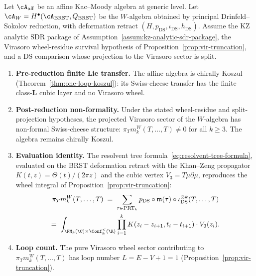 \begin{theorem}
\label{thm:tree-wheel-bridge}
Let\/ $\cA_{\mathrm{aff}}$ be an affine Kac--Moody algebra at
generic level. Let\/ $\cA_W = H^\bullet(
\cA_{\mathrm{BRST}}, Q_{\mathrm{BRST}})$ be the\/ $W$-algebra
obtained by principal Drinfeld--Sokolov reduction, with
deformation retract\/
$(H, p_{\mathrm{DS}}, \iota_{\mathrm{DS}}, h_{\mathrm{DS}})$.
Assume the KZ analytic SDR package
of Assumption~\ref{assum:kz-analytic-sdr-package}, the Virasoro
wheel-residue survival hypothesis of
Proposition~\ref{prop:vir-truncation}, and a DS comparison whose
projection to the Virasoro sector is split.
\begin{enumerate}[label=\textup{(\roman*)}]
\item \textbf{Pre-reduction finite Lie transfer.}
 The affine algebra is chirally Koszul
 \textup{(}Theorem~\textup{\ref{thm:one-loop-koszul}}\textup{)}:
 its Swiss-cheese transfer has the finite class-$\mathbf{L}$ cubic
 layer and no Virasoro wheel.

\item \textbf{Post-reduction non-formality.}
 Under the stated wheel-residue and split-projection hypotheses, the
 projected Virasoro sector of the\/ $W$-algebra has non-formal
 Swiss-cheese structure: $\pi_T m_k^W(T,\ldots,T)\neq0$ for all
 $k\geq3$. The algebra remains chirally Koszul.

\item \textbf{Evaluation identity.}
 The resolvent tree formula~\eqref{eq:resolvent-tree-formula},
 evaluated on the BRST deformation retract with the
 Khan--Zeng propagator
 $K(t,z) = \Theta(t)/(2\pi z)$ and the cubic vertex\/
 $V_3 = T\mu\partial\mu$, reproduces the wheel integral of
 Proposition~\textup{\ref{prop:vir-truncation}}:
 \begin{multline}
 \label{eq:tree-wheel-evaluation}
 \pi_T m_k^W(T, \ldots, T)
 \;=\;
 \sum_{\tau \in \mathrm{PRT}_k}
 p_{\mathrm{DS}} \circ \mathfrak{m}(\tau) \circ
 \iota_{\mathrm{DS}}^{\otimes k}(T, \ldots, T)\\
 =\;
 \int_{\FM_k(\C) \times \Conf_k^{<}(\R)}
 \prod_{i=1}^k K(z_i - z_{i+1}, t_i - t_{i+1})
 \cdot V_3(z_i).
 \end{multline}
\item \textbf{Loop count.}
 The pure Virasoro wheel sector contributing to
 $\pi_T m_k^W(T,\ldots,T)$ has loop number
 $L = E - V + 1 = 1$
 \textup{(}Proposition~\textup{\ref{prop:vir-truncation}}\textup{)}.
\end{enumerate}
\end{theorem}

